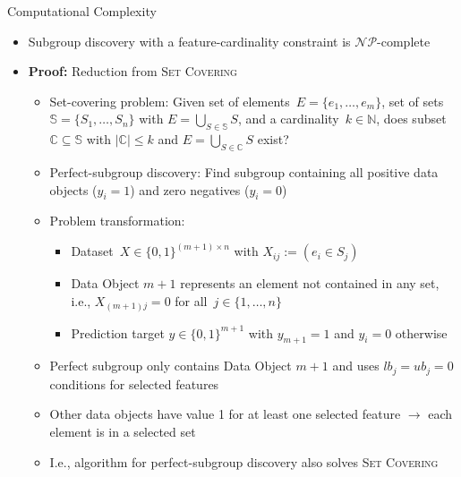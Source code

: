 \documentclass[en, navbaroff, handout]{sdqbeamer}
\begin{document}
\begin{frame}[t]{Computational Complexity}
	\begin{itemize}
		\item Subgroup discovery with a feature-cardinality constraint is $\mathcal{NP}$-complete
		\vspace{\baselineskip}
		\item \textbf{Proof:} Reduction from \textsc{Set Covering}~\cite{karp1972reducibility}
		\begin{itemize}
			\item Set-covering problem: Given set of elements~$E = \{e_1, \dots, e_m\}$, set of sets~$\mathbb{S} = \{S_1,  \dots, S_n\}$ with $E = \bigcup_{S \in \mathbb{S}} S$, and a cardinality~$k \in \mathbb{N}$, does subset $\mathbb{C} \subseteq \mathbb{S}$ with $|\mathbb{C}| \leq k$ and $E = \bigcup_{S \in \mathbb{C}} S$ exist?
			\item Perfect-subgroup discovery: Find subgroup containing all positive data objects ($y_i = 1$) and zero negatives ($y_i = 0$)
			\item Problem transformation:
			\begin{itemize}
				\item Dataset~$X \in \{0, 1\}^{(m + 1) \times n}$ with $X_{ij} := (e_i \in S_j)$
				\item Data Object $m+1$ represents an element not contained in any set, i.e., $X_{(m+1)j} = 0$ for all~$j \in \{1, \dots, n\}$
				\item Prediction target $y \in \{0, 1\}^{m+1}$ with $y_{m+1} = 1$ and $y_i = 0$ otherwise
			\end{itemize}
			\item Perfect subgroup only contains Data Object $m+1$ and uses $\mathit{lb}_j = \mathit{ub}_j = 0$ conditions for selected features
			\item Other data objects have value 1 for at least one selected feature $\rightarrow$ each element is in a selected set
			\item I.e., algorithm for perfect-subgroup discovery also solves \textsc{Set Covering}

\end{itemize}
\end{itemize}
\end{frame}
\end{document}
